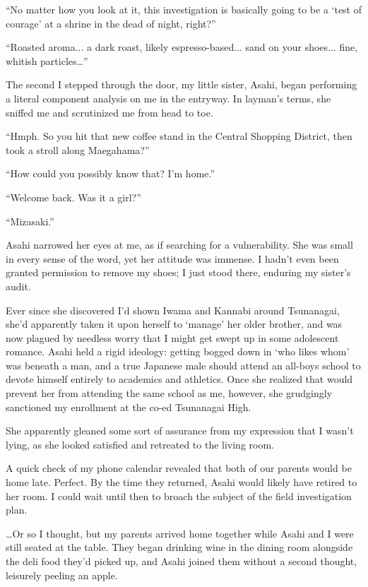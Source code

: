 \documentclass[
    a4paper,
    12pt,
    twoside,
    openany,
    UTF8,
    fontset=windows
]{ctexbook}
\begin{document}
``No matter how you look at it, this investigation is basically going to be a `test of courage' at a shrine in the dead of night, right?''

``Roasted aroma... a dark roast, likely espresso-based... sand on your shoes... fine, whitish particles\dots''

The second I stepped through the door, my little sister, Asahi, began performing a literal component analysis on me in the entryway. In layman's terms, she sniffed me and scrutinized me from head to toe.

``Hmph. So you hit that new coffee stand in the Central Shopping District, then took a stroll along Maegahama?''

``How could you possibly know that? I'm home.''

``Welcome back. Was it a girl?''

``Mizasaki.''

Asahi narrowed her eyes at me, as if searching for a vulnerability. She was small in every sense of the word, yet her attitude was immense. I hadn't even been granted permission to remove my shoes; I just stood there, enduring my sister's audit.

Ever since she discovered I'd shown Iwama and Kannabi around Tsunanagai, she'd apparently taken it upon herself to `manage' her older brother, and was now plagued by needless worry that I might get swept up in some adolescent romance. Asahi held a rigid ideology: getting bogged down in `who likes whom' was beneath a man, and a true Japanese male should attend an all-boys school to devote himself entirely to academics and athletics. Once she realized that would prevent her from attending the same school as me, however, she grudgingly sanctioned my enrollment at the co-ed Tsunanagai High.

She apparently gleaned some sort of assurance from my expression that I wasn't lying, as she looked satisfied and retreated to the living room.

A quick check of my phone calendar revealed that both of our parents would be home late. Perfect. By the time they returned, Asahi would likely have retired to her room. I could wait until then to broach the subject of the field investigation plan.

\dots Or so I thought, but my parents arrived home together while Asahi and I were still seated at the table. They began drinking wine in the dining room alongside the deli food they'd picked up, and Asahi joined them without a second thought, leisurely peeling an apple.
\end{document}
